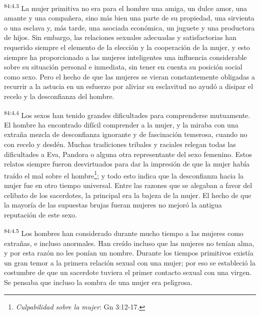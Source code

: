 \par
\textsuperscript{84:4.3} La mujer primitiva no era para el hombre una amiga, un dulce amor, una amante y una compañera, sino más bien una parte de su propiedad, una sirvienta o una esclava y, más tarde, una asociada económica, un juguete y una productora de hijos. Sin embargo, las relaciones sexuales adecuadas y satisfactorias han requerido siempre el elemento de la elección y la cooperación de la mujer, y esto siempre ha proporcionado a las mujeres inteligentes una influencia considerable sobre su situación personal e inmediata, sin tener en cuenta su posición social como sexo. Pero el hecho de que las mujeres se vieran constantemente obligadas a recurrir a la astucia en un esfuerzo por aliviar su esclavitud no ayudó a disipar el recelo y la desconfianza del hombre.

\par
\textsuperscript{84:4.4} Los sexos han tenido grandes dificultades para comprenderse mutuamente. El hombre ha encontrado difícil comprender a la mujer, y la miraba con una extraña mezcla de desconfianza ignorante y de fascinación temerosa, cuando no con recelo y desdén. Muchas tradiciones tribales y raciales relegan todas las dificultades a Eva, Pandora o alguna otra representante del sexo femenino. Estos relatos siempre fueron desvirtuados para dar la impresión de que la mujer había traído el mal sobre el hombre\footnote{\textit{Culpabilidad sobre la mujer}: Gn 3:12-17.}; y todo esto indica que la desconfianza hacia la mujer fue en otro tiempo universal. Entre las razones que se alegaban a favor del celibato de los sacerdotes, la principal era la bajeza de la mujer. El hecho de que la mayoría de las supuestas brujas fueran mujeres no mejoró la antigua reputación de este sexo.

\par
\textsuperscript{84:4.5} Los hombres han considerado durante mucho tiempo a las mujeres como extrañas, e incluso anormales. Han creído incluso que las mujeres no tenían alma, y por esta razón no les ponían un nombre. Durante los tiempos primitivos existía un gran temor a la primera relación sexual con una mujer; por eso se estableció la costumbre de que un sacerdote tuviera el primer contacto sexual con una virgen. Se pensaba que incluso la sombra de una mujer era peligrosa.

